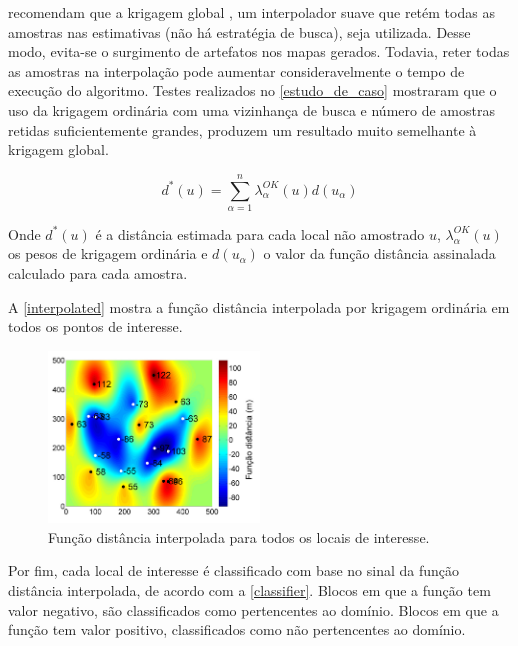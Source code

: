  recomendam que a krigagem global \cite{neufeld}, um interpolador suave que retém todas as amostras nas estimativas (não há estratégia de busca), seja utilizada. Desse modo, evita-se o surgimento de artefatos nos mapas gerados. Todavia, reter todas as amostras na interpolação pode aumentar consideravelmente o tempo de execução do algoritmo. Testes realizados no \autoref{estudo_de_caso} mostraram que o uso da krigagem ordinária com uma vizinhança de busca e número de amostras retidas suficientemente grandes, produzem um resultado muito semelhante à krigagem global.

\begin{equation}
	d^*(u)=\sum\limits_{\alpha=1}^n \lambda_\alpha^{OK}(u)d(u_\alpha)
    \label{eq_OK}
\end{equation}

Onde $d^*(u)$ é a distância estimada para cada local não amostrado $u$, $\lambda_\alpha^{OK}(u)$ os pesos de krigagem ordinária e $d(u_\alpha)$ o valor da função distância assinalada calculado para cada amostra.

A \autoref{interpolated} mostra a função distância interpolada por krigagem ordinária em todos os pontos de interesse.

\begin{figure}[!ht]
	\caption{\label{interpolated}Função distância interpolada para todos os locais de interesse.}
	\begin{center}
		\includegraphics[width=0.5\textwidth]{modelagem_geologica/interpolated}
	\end{center}
\end{figure}

Por fim, cada local de interesse é classificado com base no sinal da função distância interpolada, de acordo com a \autoref{classifier}. Blocos em que a função tem valor negativo, são classificados como pertencentes ao domínio. Blocos em que a função tem valor positivo, classificados como não pertencentes ao domínio.

